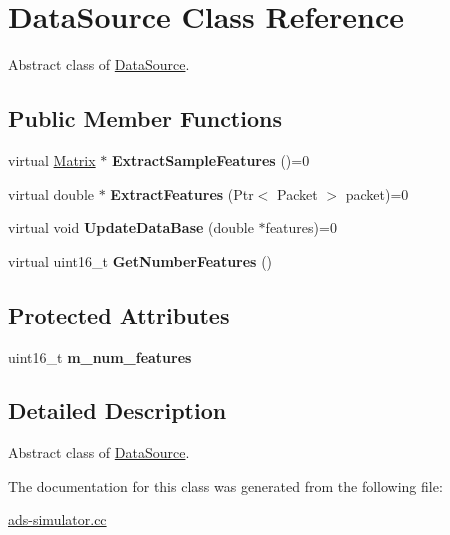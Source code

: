 \hypertarget{classDataSource}{}\section{Data\+Source Class Reference}
\label{classDataSource}


Abstract class of \hyperlink{classDataSource}{Data\+Source}.  


\subsection*{Public Member Functions}
\begin{DoxyCompactItemize}
\item 
\hypertarget{classDataSource_a3c50a75418afefcc1e57577c033c6678}{}virtual \hyperlink{classMatrix}{Matrix} $\ast$ {\bfseries Extract\+Sample\+Features} ()=0\label{classDataSource_a3c50a75418afefcc1e57577c033c6678}

\item 
\hypertarget{classDataSource_a2001cf0cb5718df33bfe83607e56057b}{}virtual double $\ast$ {\bfseries Extract\+Features} (Ptr$<$ Packet $>$ packet)=0\label{classDataSource_a2001cf0cb5718df33bfe83607e56057b}

\item 
\hypertarget{classDataSource_ae4f3eda38c1c60f0dbfe56dc0199f5e3}{}virtual void {\bfseries Update\+Data\+Base} (double $\ast$features)=0\label{classDataSource_ae4f3eda38c1c60f0dbfe56dc0199f5e3}

\item 
\hypertarget{classDataSource_a50bf1acad05cf5db970319524f503be7}{}virtual uint16\+\_\+t {\bfseries Get\+Number\+Features} ()\label{classDataSource_a50bf1acad05cf5db970319524f503be7}

\end{DoxyCompactItemize}
\subsection*{Protected Attributes}
\begin{DoxyCompactItemize}
\item 
\hypertarget{classDataSource_a71c41d9d7d6cfdd4db0e0176a24f0521}{}uint16\+\_\+t {\bfseries m\+\_\+num\+\_\+features}\label{classDataSource_a71c41d9d7d6cfdd4db0e0176a24f0521}

\end{DoxyCompactItemize}


\subsection{Detailed Description}
Abstract class of \hyperlink{classDataSource}{Data\+Source}. 

The documentation for this class was generated from the following file\+:\begin{DoxyCompactItemize}
\item 
\hyperlink{ads-simulator_8cc}{ads-\/simulator.\+cc}\end{DoxyCompactItemize}
